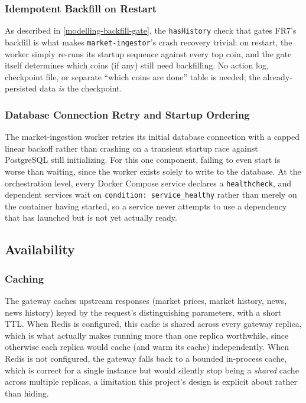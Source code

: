 \documentclass{scrartcl}
\begin{document}
\subsubsection{Idempotent Backfill on Restart}\label{fault-tolerance-backfill}

As described in \cref{modelling-backfill-gate}, the \texttt{hasHistory} check that gates FR7's
backfill is what makes \texttt{market-ingestor}'s crash recovery trivial: on restart, the worker
simply re-runs its startup sequence against every top coin, and the gate itself determines which
coins (if any) still need backfilling. No action log, checkpoint file, or separate ``which coins
are done'' table is needed; the already-persisted data \emph{is} the checkpoint.

\subsubsection{Database Connection Retry and Startup Ordering}\label{fault-tolerance-retry}

The market-ingestion worker retries its initial database connection with a capped linear backoff
rather than crashing on a transient startup race against PostgreSQL still initializing. For this
one component, failing to even start is worse than waiting, since the worker exists solely to
write to the database. At the orchestration level, every Docker Compose service declares a
\texttt{healthcheck}, and dependent services wait on \texttt{condition: service\_healthy} rather
than merely on the container having started, so a service never attempts to use a dependency that
has launched but is not yet actually ready.

\subsection{Availability}\label{availability}

\subsubsection{Caching}\label{availability-caching}

The gateway caches upstream responses (market prices, market history, news, news history) keyed
by the request's distinguishing parameters, with a short TTL. When Redis is configured, this
cache is shared across every gateway replica, which is what actually makes running more than one
replica worthwhile, since otherwise each replica would cache (and warm its cache) independently.
When Redis is not configured, the gateway falls back to a bounded in-process cache, which is
correct for a single instance but would silently stop being a \emph{shared} cache across multiple
replicas, a limitation this project's design is explicit about rather than hiding.
\end{document}
